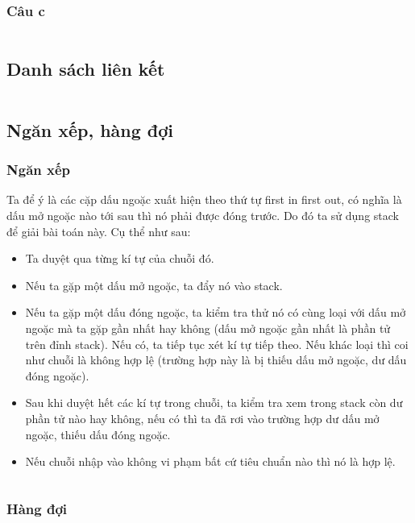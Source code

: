 \documentclass[main.tex]{subfiles}
\begin{document}
\subsubsection{Câu c}
\inputminted[linenos]{cpp}{answer_sources/ConTroNC_c.cpp}


\subsection{Danh sách liên kết}
\inputminted[linenos]{cpp}{answer_sources/DanhSachLK.cpp}


\subsection{Ngăn xếp, hàng đợi}
\subsubsection{Ngăn xếp}
Ta để ý là các cặp dấu ngoặc xuất hiện theo thứ tự 
first in first out, có nghĩa là dấu mở ngoặc nào tới sau thì nó phải được đóng trước. Do đó ta sử dụng stack để giải bài toán này. Cụ thể như sau:
\begin{itemize}
    \item Ta duyệt qua từng kí tự của chuỗi đó.
    \item Nếu ta gặp một dấu mở ngoặc, ta đẩy nó vào stack.
    \item Nếu ta gặp một dấu đóng ngoặc, ta kiểm tra thử nó có cùng loại với dấu mở ngoặc mà ta gặp gần nhất hay không (dấu mở ngoặc gần nhất là phần tử trên đỉnh stack). Nếu có, ta tiếp tục xét kí tự tiếp theo. Nếu khác loại thì coi như chuỗi là không hợp lệ (trường hợp này là bị thiếu dấu mở ngoặc, dư dấu đóng ngoặc).
    \item Sau khi duyệt hết các kí tự trong chuỗi, ta kiểm tra xem trong stack còn dư phần tử nào hay không, nếu có thì ta đã rơi vào trường hợp dư dấu mở ngoặc, thiếu dấu đóng ngoặc.
    \item Nếu chuỗi nhập vào không vi phạm bất cứ tiêu chuẩn nào thì nó là hợp lệ.
\end{itemize}

\inputminted[linenos]{cpp}{answer_sources/Stack.cpp}


\subsubsection{Hàng đợi}
\end{document}
